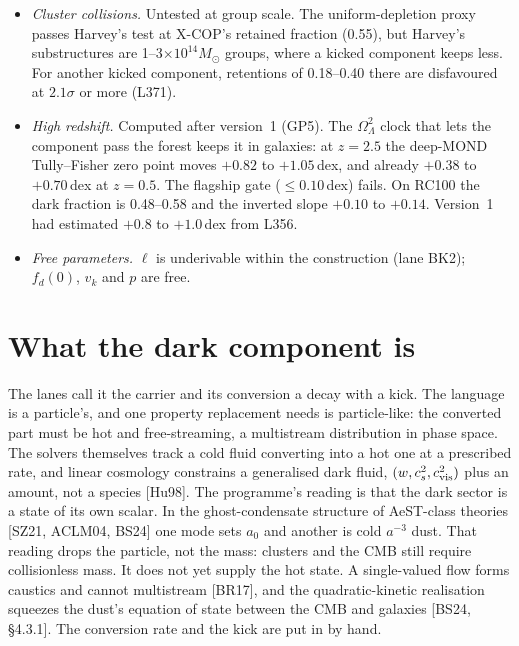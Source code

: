 \documentclass[10pt]{article}
\begin{document}
\begin{itemize}
\item \emph{Cluster collisions.} Untested at group scale. The uniform-depletion proxy passes Harvey's test at X-COP's retained fraction (0.55), but Harvey's substructures are 1--3$\times10^{14}M_\odot$ groups, where a kicked component keeps less. For another kicked component, retentions of 0.18--0.40 there are disfavoured at $2.1\sigma$ or more (L371).
\item \emph{High redshift.} Computed after version~1 (GP5). The $\Omega_\Lambda^2$ clock that lets the component pass the forest keeps it in galaxies: at $z=2.5$ the deep-MOND Tully--Fisher zero point moves $+0.82$ to $+1.05$\,dex, and already $+0.38$ to $+0.70$\,dex at $z=0.5$. The flagship gate ($\leq0.10$\,dex) fails. On RC100 the dark fraction is 0.48--0.58 and the inverted slope $+0.10$ to $+0.14$. Version~1 had estimated $+0.8$ to $+1.0$\,dex from L356.
\item \emph{Free parameters.} $\ell$ is underivable within the construction (lane BK2); $f_d(0)$, $v_k$ and $p$ are free.
\end{itemize}

\section{What the dark component is}\label{sec:what}
The lanes call it the carrier and its conversion a decay with a kick. The language is a particle's, and one property replacement needs is particle-like: the converted part must be hot and free-streaming, a multistream distribution in phase space. The solvers themselves track a cold fluid converting into a hot one at a prescribed rate, and linear cosmology constrains a generalised dark fluid, $(w,c_s^2,c_{\rm vis}^2)$ plus an amount, not a species [Hu98].
The programme's reading is that the dark sector is a state of its own scalar. In the ghost-condensate structure of AeST-class theories [SZ21, ACLM04, BS24] one mode sets $a_0$ and another is cold $a^{-3}$ dust. That reading drops the particle, not the mass: clusters and the CMB still require collisionless mass. It does not yet supply the hot state. A single-valued flow forms caustics and cannot multistream [BR17], and the quadratic-kinetic realisation squeezes the dust's equation of state between the CMB and galaxies [BS24, \S4.3.1]. The conversion rate and the kick are put in by hand.
\end{document}
